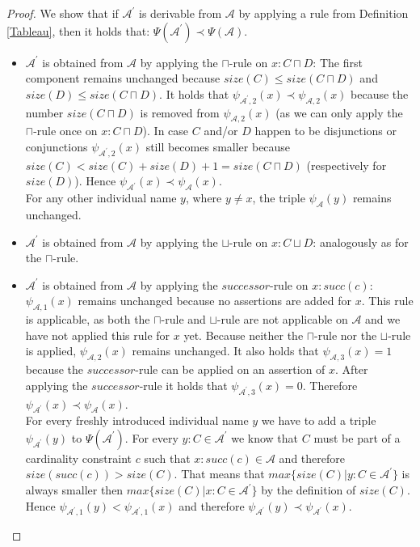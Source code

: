 \documentclass{book}
\theoremstyle{break}
\theoremstyle{definition}
\begin{document}
\begin{proof}
We show that if $\mathcal{A}^\prime$ is derivable from $\mathcal{A}$ by applying a rule from Definition \ref{Tableau}, then it holds that: $\Psi(\mathcal{A}^\prime)\prec \Psi(\mathcal{A})$.\\
\begin{itemize}
\item $\mathcal{A}^\prime$ is obtained from $\mathcal{A}$ by applying the $\sqcap$-rule on $x:C\sqcap D$: The first component remains unchanged because $size(C)\leq size(C\sqcap D)$ and $size(D)\leq size(C\sqcap D)$. It holds that $\psi_{\mathcal{A}^\prime,2}(x)\prec\psi_{\mathcal{A},2}(x)$ because the number $size(C\sqcap D)$ is removed from $\psi_{\mathcal{A},2}(x)$ (as we can only apply the $\sqcap$-rule once on $x:C\sqcap D$). In case $C$ and/or $D$ happen to be disjunctions or conjunctions $\psi_{\mathcal{A}^\prime,2}(x)$ still becomes smaller because $size(C)< size(C)+size(D)+1=size(C\sqcap D)$ (respectively for $size(D)$). Hence $\psi_{\mathcal{A}^\prime}(x)\prec\psi_{\mathcal{A}}(x)$.\\
For any other individual name $y$, where $y\neq x$, the triple $\psi_\mathcal{A}(y)$ remains unchanged.
\item $\mathcal{A}^\prime$ is obtained from $\mathcal{A}$ by applying the $\sqcup$-rule on $x:C\sqcup D$: analogously as for the $\sqcap$-rule.
\item $\mathcal{A}^\prime$ is obtained from $\mathcal{A}$ by applying the $successor$-rule on $x:succ(c)$: $\psi_{\mathcal{A},1}(x)$ remains unchanged because no assertions are added for $x$. This rule is applicable, as both the $\sqcap$-rule and $\sqcup$-rule are not applicable on $\mathcal{A}$ and we have not applied this rule for $x$ yet. Because neither the $\sqcap$-rule nor the $\sqcup$-rule is applied, $\psi_{\mathcal{A},2}(x)$ remains unchanged. It also holds that $\psi_{\mathcal{A},3}(x)=1$ because the $successor$-rule can be applied on an assertion of $x$. After applying the $successor$-rule it holds that $\psi_{\mathcal{A}^\prime,3}(x)=0$. Therefore $\psi_{\mathcal{A}^\prime}(x)\prec\psi_\mathcal{A}(x)$.\\
For every freshly introduced individual name $y$ we have to add a triple $\psi_{\mathcal{A}^\prime}(y)$ to $\Psi(\mathcal{A}^\prime)$. For every $y:C\in\mathcal{A}^\prime$ we know that $C$ must be part of a cardinality constraint $c$ such that $x:succ(c)\in\mathcal{A}$ and therefore $size(succ(c))>size(C)$. That means that $max\{size(C)|y:C\in\mathcal{A}^\prime\}$ is always smaller then $max\{size(C)|x:C\in\mathcal{A}^\prime\}$ by the definition of $size(C)$. Hence $\psi_{\mathcal{A}^\prime,1}(y)<\psi_{\mathcal{A}^\prime,1}(x)$ and therefore $\psi_{\mathcal{A}^\prime}(y)\prec\psi_{\mathcal{A}^\prime}(x)$.\\

\end{itemize}
\end{proof}
\end{document}
